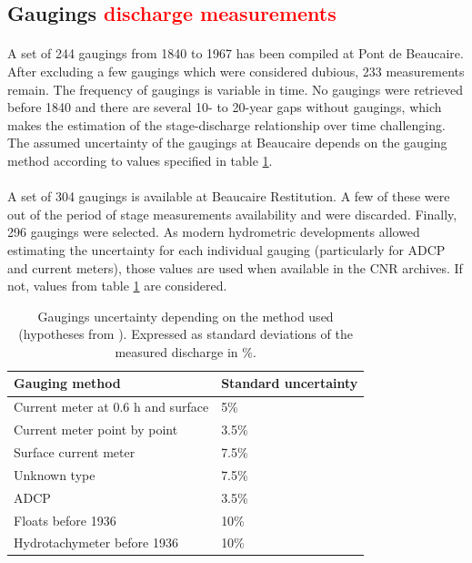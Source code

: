 \documentclass[11pt]{article}
\begin{document}
    \subsection{Gaugings \textcolor{red}{discharge measurements}}

    \paragraph{}
    A set of 244 gaugings from 1840 to 1967 has been compiled at Pont de Beaucaire. After excluding a few gaugings which were considered dubious, 233 measurements remain. The frequency of gaugings is variable in time. No gaugings were retrieved before 1840 and there are several 10- to 20-year gaps without gaugings, which makes the estimation of the stage-discharge relationship over time challenging. The assumed uncertainty of the gaugings at Beaucaire depends on the gauging method according to \citet{bard_actualisation_2018} values specified in table \ref{TabIcJau}.
    
    \paragraph{}    
    A set of 304 gaugings is available at Beaucaire Restitution. A few of these were out of the period of stage measurements availability and were discarded. Finally, 296 gaugings were selected. As modern hydrometric developments allowed estimating the uncertainty for each individual gauging (particularly for ADCP and current meters), those values are used when available in the CNR archives. If not, values from table \ref{TabIcJau} are considered. 
        
         \begin{table}[ht]
            \centering
                \begin{tabular}{| l | l |} 
                        \hline
                        \textbf{Gauging method} & \textbf{Standard uncertainty} \\
                        \hline
                        Current meter at 0.6 h and surface & 5\% \\
                        \hline
                        Current meter point by point & 3.5\% \\
                        \hline
                        Surface current meter & 7.5\% \\
                        \hline
                        Unknown type & 7.5\% \\
                        \hline
                        ADCP & 3.5\% \\
                        \hline
                        Floats before 1936 & 10\% \\
                        \hline
                        Hydrotachymeter before 1936 & 10\%\\
                        \hline
                \end{tabular}
            \caption{Gaugings uncertainty depending on the method used (hypotheses from \citet{bard_actualisation_2018}). Expressed as standard deviations of the measured discharge in \%.}
            \label{TabIcJau}
        \end{table}
         \FloatBarrier
\end{document}
